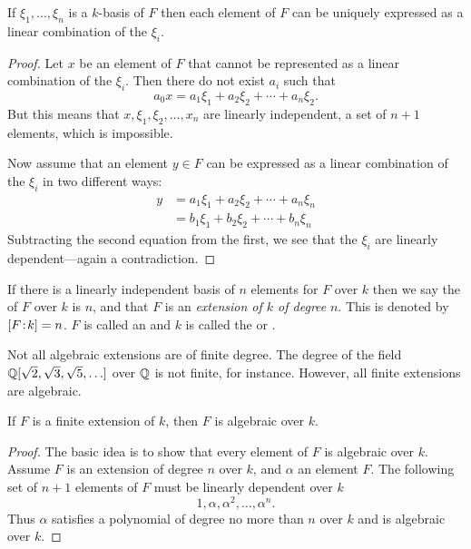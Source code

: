 \begin{proposition}
If $\xi_{1}, \ldots, \xi_{n}$ is a $k$-basis of $F$ then each element of
$F$ can be uniquely expressed as a linear combination of the $\xi_i$.
\end{proposition}

\begin{proof}
Let $x$ be an element of $F$ that cannot be represented as a
linear combination of the $\xi_i$.  Then there do not exist
$a_i$ such that
\[
a_0 x = a_1 \xi_1 + a_2 \xi_2 + \cdots + a_n \xi_2.
\]
But this means that $x, \xi_1, \xi_2, \ldots, x_n$ are linearly
independent, a set of $n+1$ elements, which is impossible.

Now assume that an element $y \in F$ can be expressed as a linear
combination of the $\xi_i$ in two different ways:
\[
\begin{aligned}
y &= a_1 \xi_1 + a_2 \xi_2 + \cdots + a_n \xi_n\\
&= b_1 \xi_1 + b_2 \xi_2 + \cdots + b_n \xi_n
\end{aligned}
\]
Subtracting the second equation from the first, we see that the $\xi_i$ are
linearly dependent---again a contradiction.
\end{proof}


If there is a linearly independent basis of $n$ elements for $F$ over $k$
then we say the  of $F$ over $k$ is $n$, and that $F$ is an
{\em extension of $k$ of degree} $n$. This is
denoted by $[F\!:\!k] = n$.  $F$ is called an  and $k$ is called the  or .

Not all algebraic extensions are of finite degree.  The degree of the field
$\mathbb{Q}[\sqrt{2}, \sqrt{3}, \sqrt{5}, \ldots]$ over $\mathbb{Q}$ is not finite, for
instance.  However, all finite extensions are algebraic.

\begin{proposition}
If $F$ is a finite extension of $k$, then $F$ is algebraic over $k$.
\end{proposition}

\begin{proof}
The basic idea is to show that every element of $F$ is algebraic over $k$.
Assume $F$ is an extension of degree $n$ over $k$, and $\alpha$
an element $F$.  The following set of $n+1$ elements of $F$ must be 
linearly dependent over $k$
\[
1, \alpha, \alpha^2, \ldots, \alpha^n.
\]
Thus $\alpha$ satisfies a polynomial of degree no more than $n$ over
$k$ and is algebraic over $k$. 
\end{proof}

